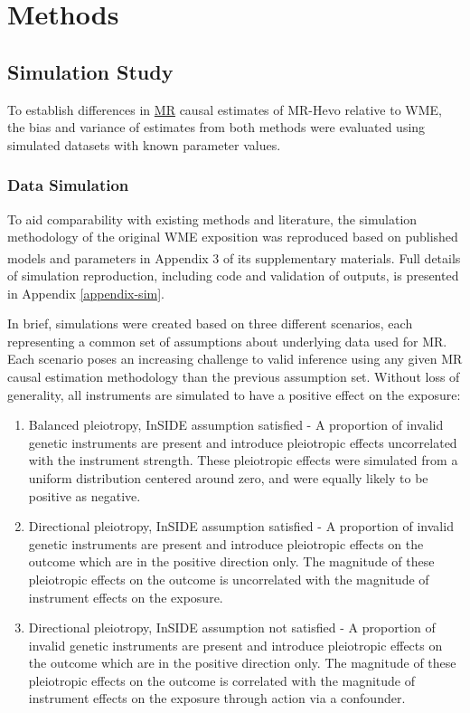 \documentclass[
]{article}
\begin{document}
\newpage

\section{Methods}\label{Methods}

\subsection{Simulation Study}\label{simulation-study}

To establish differences in \hyperref[acronyms_MR]{MR} causal estimates of MR-Hevo relative to WME, the bias and variance of estimates from both methods were evaluated using simulated datasets with known parameter values.

\subsubsection{Data Simulation}\label{data-simulation}

To aid comparability with existing methods and literature, the simulation methodology of the original WME exposition was reproduced based on published models and parameters in Appendix 3 of its supplementary materials\textsuperscript{}. Full details of simulation reproduction, including code and validation of outputs, is presented in Appendix \ref{appendix-sim}.

In brief, simulations were created based on three different scenarios, each representing a common set of assumptions about underlying data used for MR. Each scenario poses an increasing challenge to valid inference using any given MR causal estimation methodology than the previous assumption set. Without loss of generality, all instruments are simulated to have a positive effect on the exposure:

\begin{enumerate}
\def\labelenumi{\arabic{enumi}.}
\item
  Balanced pleiotropy, InSIDE assumption satisfied - A proportion of invalid genetic instruments are present and introduce pleiotropic effects uncorrelated with the instrument strength. These pleiotropic effects were simulated from a uniform distribution centered around zero, and were equally likely to be positive as negative.
\item
  Directional pleiotropy, InSIDE assumption satisfied - A proportion of invalid genetic instruments are present and introduce pleiotropic effects on the outcome which are in the positive direction only. The magnitude of these pleiotropic effects on the outcome is uncorrelated with the magnitude of instrument effects on the exposure.
\item
  Directional pleiotropy, InSIDE assumption not satisfied - A proportion of invalid genetic instruments are present and introduce pleiotropic effects on the outcome which are in the positive direction only. The magnitude of these pleiotropic effects on the outcome is correlated with the magnitude of instrument effects on the exposure through action via a confounder.
\end{enumerate}
\end{document}
